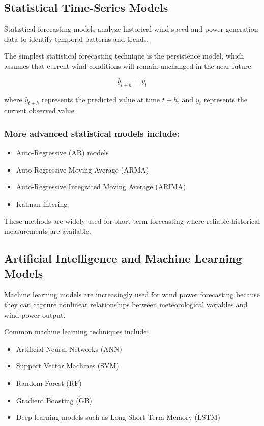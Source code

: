 \documentclass[12pt,a4paper]{article}
\begin{document}
\subsection{Statistical Time-Series Models}

Statistical forecasting models analyze historical wind speed and power generation data to identify temporal patterns and trends.

The simplest statistical forecasting technique is the persistence model, which assumes that current wind conditions will remain unchanged in the near future.

\begin{equation}
\hat{y}_{t+h} = y_t
\label{eq:persistence}
\end{equation}

where $\hat{y}_{t+h}$ represents the predicted value at time $t+h$, and $y_t$ represents the current observed value.

\subsubsection*{More advanced statistical models include:}

\begin{itemize}
\item Auto-Regressive (AR) models
\item Auto-Regressive Moving Average (ARMA)
\item Auto-Regressive Integrated Moving Average (ARIMA)
\item Kalman filtering
\end{itemize}

These methods are widely used for short-term forecasting where reliable historical measurements are available.

\subsection{Artificial Intelligence and Machine Learning Models}

Machine learning models are increasingly used for wind power forecasting because they can capture nonlinear relationships between meteorological variables and wind power output.

Common machine learning techniques include:

\begin{itemize}
\item Artificial Neural Networks (ANN)
\item Support Vector Machines (SVM)
\item Random Forest (RF)
\item Gradient Boosting (GB)
\item Deep learning models such as Long Short-Term Memory (LSTM)
\end{itemize}
\end{document}
